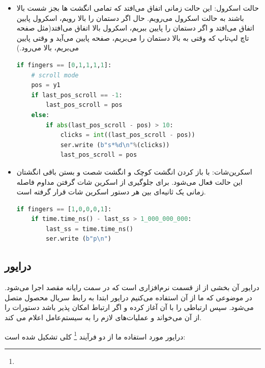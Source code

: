 \documentclass{article}
\begin{document}
\begin{itemize}
	\item حالت اسکرول:
	این حالت زمانی اتفاق می‌افتد که تمامی انگشت ها بجز شست بالا باشند به حالت اسکرول می‌رویم. حال اگر دستمان را بالا رویم، اسکرول پایین اتفاق می‌افتد و اگر دستمان را پایین ببریم، اسکرول بالا اتفاق می‌افتد(مثل صفحه تاچ لپ‌تاپ که وقتی به بالا دستمان را می‌بریم، صفحه پایین می‌آید و وقتی پایین می‌بریم، بالا می‌رود.)
	
\begin{latin}
\begin{lstlisting}[language=python]
if fingers == [0,1,1,1,1]:
    # scroll mode
    pos = y1
    if last_pos_scroll == -1:
        last_pos_scroll = pos
    else:
        if abs(last_pos_scroll - pos) > 10:
            clicks = int((last_pos_scroll - pos))
            ser.write (b"s*%d\n"%(clicks))
            last_pos_scroll = pos
\end{lstlisting}	
\end{latin}
	
	
	\item اسکرین‌شات:
	با باز کردن انگشت کوچک و انگشت شصت و بستن باقی انگشتان این حالت فعال می‌شود. برای جلوگیری از اسکرین شات گرفتن مداوم فاصله زمانی یک ثانیه‌ای بین هر دستور اسکرین شات قرار گرفته است.
	
\begin{latin}
\begin{lstlisting}[language=python]
if fingers == [1,0,0,0,1]:
    if time.time_ns() - last_ss > 1_000_000_000:
        last_ss = time.time_ns()
        ser.write (b"p\n")
\end{lstlisting}	
\end{latin}
	
\end{itemize}

\subsection{درایور}
درایور آن بخشی از از قسمت نرم‌افزاری است که در سمت رایانه مقصد اجرا می‌شود. در موضوعی که ما از آن استفاده می‌کنیم درایور ابتدا به رابط سریال محصول متصل می‌شود. سپس ارتباطی را با آن آغاز کرده و اگر ارتباط امکان پذیر باشد دستورات را از آن می‌خواند و عملیات‌های لازم را به سیستم‌عامل اعلام می‌ کند. 

درایور مورد استفاده ما از دو فرآیند \footnote{} کلی تشکیل شده است:
\end{document}
